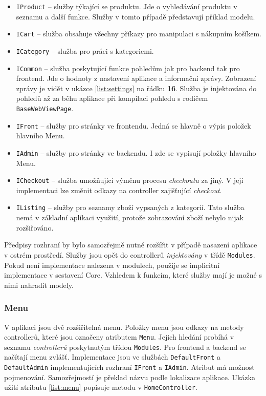\documentclass[11pt,twoside,a4paper]{book}
\begin{document}
\begin{itemize}
\item \texttt{IProduct} -- služby týkající se produktu. Jde o vyhledávání produktu v seznamu a další funkce. Služby v tomto případě představují příklad modelu.
\item \texttt{ICart} -- služba obsahuje všechny příkazy pro manipulaci s nákupním košíkem.
\item \texttt{ICategory} -- služba pro práci s kategoriemi.
\item \texttt{ICommon} -- služba poskytující funkce pohledům jak pro backend tak pro frontend. Jde o hodnoty z nastavení aplikace a informační zprávy. Zobrazení zprávy je vidět v ukázce \ref{list:settings} na řádku \textbf{16}. Služba je injektována do pohledů až za běhu aplikace při kompilaci pohledu s rodičem \texttt{BaseWebViewPage}.
\item \texttt{IFront} -- služby pro stránky ve frontendu. Jedná se hlavně o výpis položek hlavního Menu.
\item \texttt{IAdmin} -- služby pro stránky ve backendu. I zde se vypisují položky hlavního Menu.
\item \texttt{ICheckout} -- služba umožňující výměnu procesu \textit{checkoutu} za jiný. V její implementaci lze změnit odkazy na controller zajišťující \textit{checkout}.
\item \texttt{IListing} -- služby pro seznamy zboží vypsaných z kategorií. Tato služba nemá v základní aplikaci využití, protože zobrazování zboží nebylo nijak rozšiřováno.
\end{itemize}
 
Předpisy rozhraní by bylo samozřejmě nutné rozšířit v případě nasazení aplikace v ostrém prostředí. Služby jsou opět do controllerů \textit{injektovány} v třídě \texttt{Modules}. Pokud není implementace nalezena v modulech, použije se implicitní implementace v sestavení \textsf{Core}. Vzhledem k funkcím, které služby mají je možné s nimi nahradit modely.
 
\subsubsection{Menu}
\label{sec:menu}

V aplikaci jsou dvě rozšiřitelná menu. Položky menu jsou odkazy na metody controllerů, které jsou označeny atributem \texttt{Menu}. Jejich hledání probíhá v seznamu \textit{controllerů} poskytnutým třídou \texttt{Modules}. Pro frontend a backend se načítají menu zvlášť. Implementace jsou ve službách \texttt{DefaultFront} a \texttt{DefaultAdmin} implementujících rozhraní \texttt{IFront} a \texttt{IAdmin}. Atribut má možnost pojmenování. Samozřejmostí je překlad názvu podle lokalizace aplikace. Ukázka užití atributu \ref{list:menu} popisuje metodu v \texttt{HomeController}. 
\end{document}
